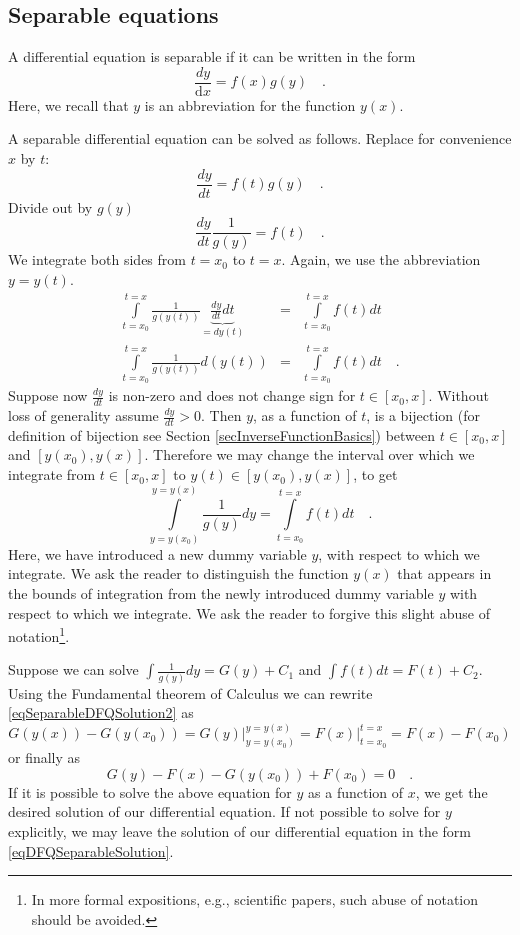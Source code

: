 \documentclass[12pt]{book}
\newcommand{\diff}{\text{d}}
\begin{document}
\subsection{Separable equations}
A differential equation is separable if it can be written in the form 
\begin{equation}\label{eqDFQSeparable}
\frac{d y}{\diff x}= f(x)g(y)\quad .
\end{equation}
Here, we recall that $y$ is an abbreviation for the function $y(x)$. 

A separable differential equation can be solved as follows. Replace for convenience $x$ by $t$:
\[
\frac{d y}{dt}= f(t)g(y)\quad .
\]
Divide out by $g(y)$
\[
\frac{d y}{dt} \frac{1}{g(y)}= f(t)\quad .
\]
We integrate both sides from $t=x_0$ to $t=x$. Again, we use the abbreviation $y=y(t)$.
\begin{equation}\label{eqSeparableDFQSolution1}
\begin{array}{rcl}
\displaystyle \int\limits_{t=x_0}^{t=x}\frac{1}{g(y(t))} \underbrace{\frac{d y}{dt}dt}_{= d y(t)}&=&\displaystyle \int\limits_{t=x_0}^{t=x}  f(t)dt
\\ 
\displaystyle \int\limits_{t=x_0}^{t=x}\frac{1}{g(y(t))} d(y(t))&=&\displaystyle \int\limits_{t=x_0}^{t=x}  f(t)dt
\quad .
\end{array}
\end{equation}
Suppose now $\frac{dy }{dt}$ is non-zero and does not change sign for $t\in [x_0, x]$. Without loss of generality assume $\frac{dy}{dt}>0$. Then $y$, as a function of $t$, is a bijection (for definition of bijection see Section \ref{secInverseFunctionBasics}) between $t\in [x_0, x]$ and $[y(x_0), y(x)]$. Therefore we may change the interval over which we integrate from $t\in  [x_0, x]$ to $y(t)\in [y(x_0), y(x)]$, to get 
\begin{equation}\label{eqSeparableDFQSolution2}
\displaystyle \int\limits_{y=y(x_0)}^{y=y(x)}\frac{1}{g(y)} dy=\displaystyle \int\limits_{t=x_0}^{t=x}  f(t)dt\quad .
\end{equation}
Here, we have introduced a new dummy variable $y$, with respect to which we integrate. We ask the reader to distinguish  the function $y(x)$ that appears in the bounds of integration from the newly introduced dummy variable $y$ with respect to which we integrate. We ask the reader to forgive this slight abuse of notation\footnote{In more formal expositions, e.g., scientific papers, such abuse of notation should be avoided.}.

Suppose we can solve $\displaystyle \int \frac{1}{g(y)}dy = G(y)+C_1$ and $\displaystyle \int  f(t)dt=F(t)+C_2$. Using the Fundamental theorem of Calculus we can rewrite \eqref{eqSeparableDFQSolution2} as
\[
G(y(x))-G(y(x_0)) = \left. G(y)\right|_{y=y(x_0)}^{y=y(x)} = \left. F(x) \right|_{t=x_0}^{t=x}= F(x)-F(x_0)
\]
or finally as 
\begin{equation}\label{eqDFQSeparableSolution}
G(y)-F(x)-G(y(x_0))+ F(x_0)=0\quad .
\end{equation}
If it is possible to solve the above equation for $y$ as a function of $x$, we get the desired solution of our differential equation. If not possible to solve for $y$ explicitly, we may leave the solution of our differential equation in the form \eqref{eqDFQSeparableSolution}.
\end{document}
